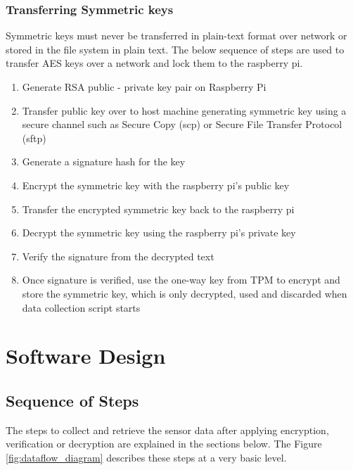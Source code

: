 \documentclass[11pt,openright]{report}
\begin{document}
\subsubsection{Transferring Symmetric keys}
Symmetric keys must never be transferred in plain-text format over network or stored in the file system in plain text. The below sequence of steps are used to transfer AES keys over a network and lock them to the raspberry pi.

\begin{enumerate}
	\item Generate RSA public - private key pair on Raspberry Pi
	\item Transfer public key over to host machine generating symmetric key using a secure channel such as Secure Copy (scp) or Secure File Transfer Protocol (sftp)
	\item Generate a signature hash for the key
	\item Encrypt the symmetric key with the raspberry pi's public key
	\item Transfer the encrypted symmetric key back to the raspberry pi
	\item Decrypt the symmetric key using the raspberry pi's private key
	\item Verify the signature from the decrypted text
	\item Once signature is verified, use the one-way key from TPM to encrypt and store the symmetric key, which is only decrypted, used and discarded when data collection script starts
\end{enumerate}





\section{Software Design} \label{ss:software_design}

\subsection{Sequence of Steps}
The steps to collect and retrieve the sensor data after applying encryption, verification or decryption are explained in the sections below. The Figure \ref{fig:dataflow_diagram} describes these steps at a very basic level.
\end{document}
